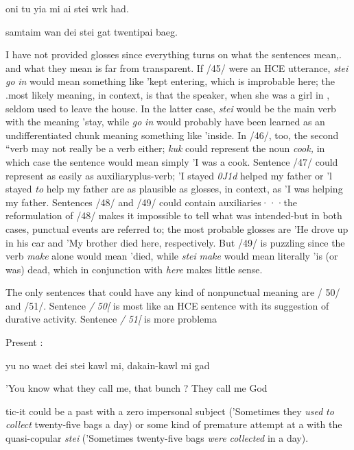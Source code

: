 \ea\label{ex:50}
 oni tu yia mi ai stei wrk had.
\glt
\z

\ea\label{ex:51}
 samtaim wan dei stei gat twentipai baeg.
\glt
\z

I have not provided glosses since everything turns on what the sentences mean,. and what they mean is far from transparent. If /45/ were an HCE utterance, \textit{stei} \textit{go} \textit{in} would mean something like 'kept entering,
which is improbable here; the .most likely meaning, in context, is that the speaker, when she was a girl in , seldom used to leave the house. In the latter case, \textit{stei} would be the main verb with the meaning
'stay, while \textit{go} \textit{in} would probably have been learned as an undifferenti\-ated chunk meaning something like 'inside. In /46/, too, the second ``verb may not really be a verb either; \textit{kuk} could represent the noun \textit{cook,} in which case the sentence would mean simply 'I was a cook. Sentence /47/ could represent  as easily as auxiliary\-plus-verb; 'I stayed \textit{0J1d} helped my father or 'l stayed \textit{to} help my father are as plausible as glosses, in context, as 'I was helping my father. Sentences /48/ and /49/ could contain auxiliaries···the reformu\-lation of /48/ makes it impossible to tell what was intended-but in both cases, punctual events are referred to; the most probable glosses are 'He drove up in his car and 'My brother died here, respectively. But /49/ is puzzling since the  verb \textit{make} alone would mean 'died, while \textit{stei} \textit{make} would mean literally 'is (or was) dead, which in conjunction with \textit{here} makes little sense.

The only sentences that could have any kind of nonpunctual meaning are / 50/ and /51/. Sentence \textit{/} \textit{50[} is most like an HCE sentence with its suggestion of durative activity. Sentence \textit{/} \textit{51[} is more problema\-


\ea\label{ex:54}
 Present :
\glt
\z

yu no waet dei stei kawl mi, dakain-kawl mi gad

'You know what they call me, that bunch ? They call me God

tic-it could be a past  with a zero impersonal subject ('Some\-times they \textit{used} \textit{to} \textit{collect} twenty-five bags a day) or some kind of premature attempt at a  with the quasi-copular \textit{stei} ('Sometimes twenty-five bags \textit{were} \textit{collected} in a day).

